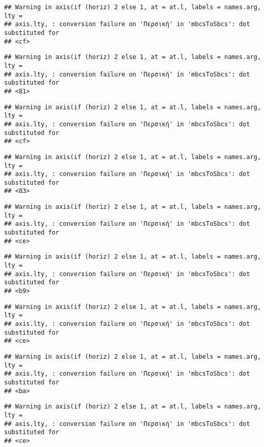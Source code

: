 \documentclass[
]{article}
\begin{document}
\begin{verbatim}
## Warning in axis(if (horiz) 2 else 1, at = at.l, labels = names.arg, lty =
## axis.lty, : conversion failure on 'Περσική' in 'mbcsToSbcs': dot substituted for
## <cf>
\end{verbatim}

\begin{verbatim}
## Warning in axis(if (horiz) 2 else 1, at = at.l, labels = names.arg, lty =
## axis.lty, : conversion failure on 'Περσική' in 'mbcsToSbcs': dot substituted for
## <81>
\end{verbatim}

\begin{verbatim}
## Warning in axis(if (horiz) 2 else 1, at = at.l, labels = names.arg, lty =
## axis.lty, : conversion failure on 'Περσική' in 'mbcsToSbcs': dot substituted for
## <cf>
\end{verbatim}

\begin{verbatim}
## Warning in axis(if (horiz) 2 else 1, at = at.l, labels = names.arg, lty =
## axis.lty, : conversion failure on 'Περσική' in 'mbcsToSbcs': dot substituted for
## <83>
\end{verbatim}

\begin{verbatim}
## Warning in axis(if (horiz) 2 else 1, at = at.l, labels = names.arg, lty =
## axis.lty, : conversion failure on 'Περσική' in 'mbcsToSbcs': dot substituted for
## <ce>
\end{verbatim}

\begin{verbatim}
## Warning in axis(if (horiz) 2 else 1, at = at.l, labels = names.arg, lty =
## axis.lty, : conversion failure on 'Περσική' in 'mbcsToSbcs': dot substituted for
## <b9>
\end{verbatim}

\begin{verbatim}
## Warning in axis(if (horiz) 2 else 1, at = at.l, labels = names.arg, lty =
## axis.lty, : conversion failure on 'Περσική' in 'mbcsToSbcs': dot substituted for
## <ce>
\end{verbatim}

\begin{verbatim}
## Warning in axis(if (horiz) 2 else 1, at = at.l, labels = names.arg, lty =
## axis.lty, : conversion failure on 'Περσική' in 'mbcsToSbcs': dot substituted for
## <ba>
\end{verbatim}

\begin{verbatim}
## Warning in axis(if (horiz) 2 else 1, at = at.l, labels = names.arg, lty =
## axis.lty, : conversion failure on 'Περσική' in 'mbcsToSbcs': dot substituted for
## <ce>
\end{verbatim}
\end{document}
